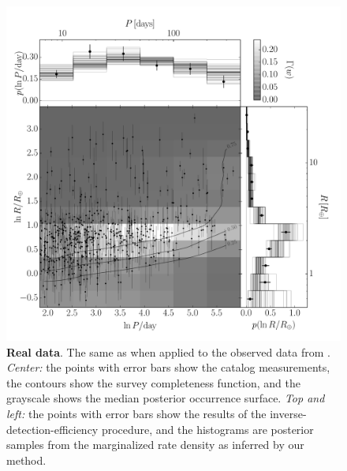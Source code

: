 \begin{figure}[p]
\begin{center}
\includegraphics[width=\textwidth]{figures/exopop/results/results.pdf}
\end{center}
\caption[The population of exoplanets]{%
{\bf Real data}.
The same as  when applied to the observed data from
\citet{Petigura:2013}.
\emph{Center:} the points with error bars show the catalog measurements, the
contours show the survey completeness function, and the grayscale shows the
median posterior occurrence surface.
\emph{Top and left:} the points with error bars show the results of the
inverse-detection-efficiency procedure, and the histograms are posterior
samples from the marginalized rate density as inferred by our method.
}
\end{figure}

